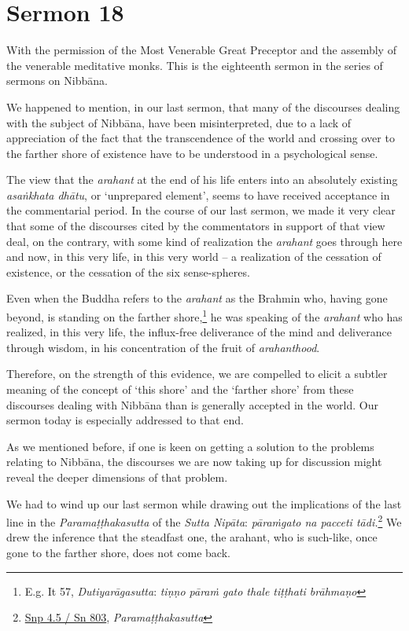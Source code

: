 \chapter{Sermon 18}

\NibbanaOpeningQuote

With the permission of the Most Venerable Great Preceptor and the assembly of the venerable meditative monks. This is the eighteenth sermon in the series of sermons on Nibbāna.

We happened to mention, in our last sermon, that many of the discourses dealing with the subject of Nibbāna, have been misinterpreted, due to a lack of appreciation of the fact that the transcendence of the world and crossing over to the farther shore of existence have to be understood in a psychological sense.

The view that the \emph{arahant} at the end of his life enters into an absolutely existing \emph{asaṅkhata dhātu}, or `unprepared element', seems to have received acceptance in the commentarial period. In the course of our last sermon, we made it very clear that some of the discourses cited by the commentators in support of that view deal, on the contrary, with some kind of realization the \emph{arahant} goes through here and now, in this very life, in this very world -- a realization of the cessation of existence, or the cessation of the six sense-spheres.

Even when the Buddha refers to the \emph{arahant} as the Brahmin who, having gone beyond, is standing on the farther shore,\footnote{E.g. It 57, \emph{Dutiyarāgasutta}: \emph{tiṇṇo pāraṁ gato thale tiṭṭhati brāhmaṇo}} he was speaking of the \emph{arahant} who has realized, in this very life, the influx-free deliverance of the mind and deliverance through wisdom, in his concentration of the fruit of \emph{arahanthood}.

Therefore, on the strength of this evidence, we are compelled to elicit a subtler meaning of the concept of `this shore' and the `farther shore' from these discourses dealing with Nibbāna than is generally accepted in the world. Our sermon today is especially addressed to that end.

As we mentioned before, if one is keen on getting a solution to the problems relating to Nibbāna, the discourses we are now taking up for discussion might reveal the deeper dimensions of that problem.

We had to wind up our last sermon while drawing out the implications of the last line in the \emph{Paramaṭṭhakasutta} of the \emph{Sutta Nipāta}: \emph{pāraṁgato na pacceti tādi.}\footnote{\href{https://suttacentral.net/snp4.5/pli/ms}{Snp 4.5 / Sn 803}, \emph{Paramaṭṭhakasutta}} We drew the inference that the steadfast one, the arahant, who is such-like, once gone to the farther shore, does not come back.


